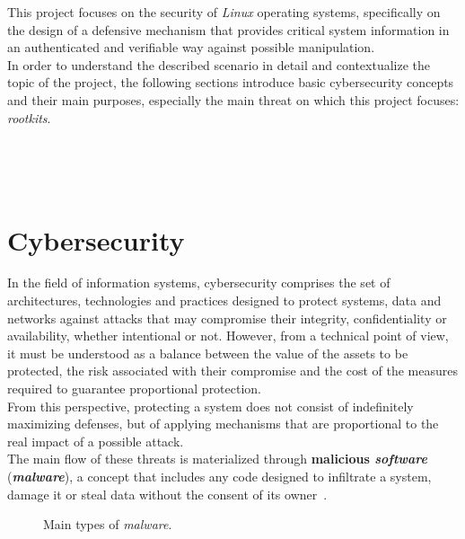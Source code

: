 This project focuses on the security of \textit{Linux} operating systems, specifically on the design of a defensive mechanism that provides critical system information in an authenticated and verifiable way against possible manipulation.\\

In order to understand the described scenario in detail and contextualize the topic of the project, the following sections introduce basic cybersecurity concepts and their main purposes, especially the main threat on which this project focuses: \textit{rootkits}.

\

\

\section{Cybersecurity}
\label{sec:seccion2}

In the field of information systems, cybersecurity comprises the set of architectures, technologies and practices designed to protect systems, data and networks against attacks that may compromise their integrity, confidentiality or availability, whether intentional or not.
However, from a technical point of view, it must be understood as a balance between the value of the assets to be protected, the risk associated with their compromise and the cost of the measures required to guarantee proportional protection.\\

From this perspective, protecting a system does not consist of indefinitely maximizing defenses, but of applying mechanisms that are proportional to the real impact of a possible attack.\\

The main flow of these threats is materialized through \textbf{malicious \textit{software}} (\textbf{\textit{malware}}), a concept that includes any code designed to infiltrate a system, damage it or steal data without the consent of its owner~\cite{malware_nist}.\\

\newpage

\begin{figure}[h!]
  \centering
  \scalebox{0.85}{}
  \caption{Main types of \textit{malware}.}
  \label{fig:types-malware}
\end{figure}

